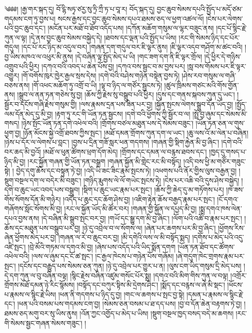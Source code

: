 \setcounter{footnote}{0} 
༄༅༅། །རྒྱ་གར་སྐད་དུ། བོ་ངྷི་སཏྭ་ཙརྱ་སུ་ཏྲི་ཀྲྀ་ཏ་པ་བཱ་ར། བོད་སྐད་དུ། བྱང་ཆུབ་སེམས་དཔའི་སྤྱོད་པ་མདོ་ཙམ་གདམས་ངག་ཏུ་བྱས་པ། སངས་རྒྱས་དང་བྱང་ཆུབ་སེམས་དཔའ་ཐམས་ཅད་ལ་ཕྱག་འཚལ་ལོ། །ངེས་པར་ལེགས་པའི་བྱང་ཆུབ་དང་། །མངོན་པར་མཐོ་བ་ཐོབ་འདོད་པས། །དཀོན་མཆོག་གསུམ་ལ་ལྷར་བཟུང་ནས། །དང་པོ་སྙིང་རྗེ་ཀུན་ལ་ལྟ། །དེ་ནས་བྱང་ཆུབ་སེམས་བསྐྱེད་དེ། །ཐབས་དང་ལྡན་པའི་སྤྱོད་པ་ཡིས། །རང་གི་སེམས་ཉིད་དང་པོར་གདུལ། །དང་པོ་རང་ཉིད་མ་འདུལ་བར། །གཞན་དག་གདུལ་བར་ཇི་ལྟར་ནུས། །ཇི་ལྟར་འདབ་གཤོག་མ་ཚང་བའི། །བྱ་ཡིས་མཁའ་ལ་འཕུར་མི་ནུས། །དེ་བཞིན་ལྟ་སྤྱོད་མེད་པ་ཡི། །གང་ཟག་དག་ནི་ཇི་ལྟར་གྲོལ། །དེ་ཕྱིར་དེ་གཉིས་འགྲུབ་པའི་ཕྱིར། །དཀའ་བའི་འབད་པ་ཆེན་པོས་བྱ། །དཀའ་བས་སྦྱང་བ་མ་བྱས་པར། །སླ་བས་གོམས་པར་ཇི་ལྟར་འགྱུར། །གོ་བགོས་ཁུར་ཁྱེར་རྒྱལ་སྲས་དེས། །དགེ་བའི་བཤེས་གཉེན་བསྟེན་བྱས་ཏེ། །ཤེས་རབ་གསུམ་ལ་གཞི་བཅས་ནས། །གོ་འཕང་མཆོག་ཏུ་འགྲོ་བ་ཡི། །ལྟ་བ་ཉིད་ལ་གཙོར་སྦྱངས་ཏེ། །ཚུལ་ཁྲིམས་གཙང་མའི་གོས་གྱོན་ནས། །སྒྲུབ་ལ་ནན་ཏན་གཅེས་སུ་བྱ། །ཆོས་ཀྱི་རྗེས་སུ་བསྒྲུབ་པའི་ཕྱིར། །དུས་དང་གནས་སྐབས་ཀུན་དུ་ཡང་། །སྦྱོར་བ་དངོས་གཞི་རྗེས་གསུམ་གྱི། །ལས་རྣམས་དྲན་པས་ཟིན་པར་བྱ། །སྐྱོན་སྤངས་ལེགས་སྒྲུབ་དོན་ཡོད་བྱ། །སྤྱོད་ལམ་དོན་མེད་དུ་མི་བྱ། །རྟག་ཏུ་རང་གི་ཡོན་ཏན་སྦྱངས། །དགེ་བའི་ཕྱོགས་ཀྱི་སྦྱོར་བ་ལ། །སྤྲོ་བྱ་ཞུམ་དང་སེམས་མི་གསད། །ཉེས་སྤོང་ཡོན་ཏན་དགེ་འཕེལ་བའི། །གྲོགས་བཙལ་མཐུན་པས་དེ་སེམས་བཟུང་། །ཡོན་ཏན་ཅན་ལ་གུས་ཕྱག་བྱ། །ཉོན་མོངས་སྐྱེ་འགྲོ་ཐབས་ཀྱིས་སྤང་། །མཐོ་དམན་གྲོགས་ཀུན་དག་ལ་ཡང་། །ཆུ་ལས་འོ་མ་ལེན་པ་བཞིན། །ཉེས་པ་དོར་ལ་ལེགས་པ་བླང་། །བྱས་པ་དྲིན་གཟོ་སླར་ཕན་གདགས། །གཞན་གྱི་སྡིག་རྐྱེན་མི་བྱ་ཞིང་། །དགེ་བའི་བར་ཆད་མི་བྱའོ། །མཐོ་ལ་ཕུན་ཚོགས་ཕྲག་དོག་མེད། །གྲོགས་དང་དམན་ལ་བརྙས་ཐབས་དང་། །ཁྱད་དུ་གསད་པ་ཉིད་མི་བྱ། །རང་སྐྱོན་གཞན་གྱི་ཡོན་ཏན་བསྒྲག །གཞན་སྐྱོན་མི་གླེང་རང་མི་བསྟོད། །འདི་བས་ཕྱི་མ་གཙོར་གཟུང་སྟེ། །
བྱེད་དགུ་ཆོས་དང་བསྟུན་ཏེ་བྱ། །འདི་ཡི་ཟང་ཟིང་རྣམ་སྤངས་ཏེ། །འཕགས་པའི་ནོར་གྱིས་ལུས་བརྒྱན་བྱ། །སྡུག་བསྔལ་དག་ལ་བདེར་མི་བཟུང་། །གཉིད་རྨུགས་ལེ་ལོ་གཡེང་སྤངས་ཏེ། །ངེས་པར་འཆི་བའི་དུས་ཤེས་བསྐྱེད། །དགེ་བ་ཆུང་ཡང་འབད་པས་བསྒྲུབ། །སྡིག་པ་ཆུང་ཡང་རྣམ་པར་སྤང་། །ཆོས་ཀྱི་ཆེད་དུ་མ་གཏོགས་པར། །ཁ་ཟས་གོས་སོགས་དོན་མི་གཉེར། །འདོད་པ་ཆུང་དང་ཆོག་ཤེས་བྱ། །འཇིག་རྟེན་ཆོས་བརྒྱད་རྣམ་པར་སྤང་། །ངོ་དགའ་གཞོགས་སློང་སོགས་མི་བྱ། །རང་ལ་སྐྱོན་ཡོད་མི་ཚོར་བར། །གཞན་གྱི་སྐྱོན་ལ་དཔྱད་མི་བྱ། །སྨྲ་དགའ་ཁས་ལེན་དཔའ་བྱས་ནས། །དེ་བཞིན་མི་སྒྲུབ་སྤང་བར་བྱ། །གཡོ་དང་སྒྱུ་དག་མི་བྱ་ཞིང་། །ལོག་པའི་འཚོ་བ་རྣམ་པར་སྤང་། །ཆོས་དང་མཐུན་པས་བསྒྲུབ་པར་བྱ། །ཉེ་དུ་འབྲེལ་བ་ལ་སོགས་ལ། །ཞེན་པར་ཆགས་པར་མི་བྱ་ཞིང་། །ཕྱོགས་རིས་ཞེན་ཕྱོགས་མེད་པར་བྱ། །གཞན་ལ་རེ་བ་ཆུང་བར་བྱ། །མི་དགེའི་ལས་ལ་མི་བསྟོད་སྨད། །དགོས་པ་མེད་པའི་འདུ་འཛི་སྤང་། །བྲེ་མོའི་གཏམ་ལ་དགའ་མི་བྱ། །ཞེས་པས་འདོད་པའི་ཡིད་སྨོན་དགག །ཡོན་ཏན་ཐོབ་དང་ཚོགས་འཕེལ་བའི། །ལས་ལ་ཞུམ་དང་ངོ་ཚ་སྤང་། །ང་རྒྱལ་ཁེངས་པ་གཉེན་པོས་གཞོམ། །ཞེ་གདུག་ཁེང་གྲགས་རྣམ་པར་སྤང་། །དངོས་དང་བརྒྱུད་པས་སེམས་ཅན་ཀུན། །ཉེ་དུ་འབྲེལ་པར་གྱུར་པ་ན། །ལུས་ངག་ཡིད་གསུམ་དྲི་མེད་པས། །དེ་དག་ཀུན་ལ་བུ་བཞིན་བལྟ། །སྙིང་རྗེས་བཞིན་འཛུམ་གསོང་པོར་སྨྲ། །དགའ་བའི་མིག་གིས་ཀུན་ལ་བལྟ། །འགྲོར་གྲོགས་མཐོ་དམན་ཉེ་རིང་སྙོམས། །བསྟོད་དང་བཀུར་སྟིས་མི་དྲེགས་ཤིང་། །སྨོད་དང་བརྙས་ལ་ཞེ་མི་སྡང་། །ཕོངས་པ་རྣམས་ལ་སྙིང་རྗེ་ཡིས། །ཕན་ནི་གདགས་པ་ཉིད་དུ་བྱ། །གང་ལ་ཆགས་པ་སྤང་བྱ་སྟེ། །དམན་པ་རྣམས་ལ་སྙིང་རྗེ་དང་། །ཕན་པའི་བསམ་པས་གདམས་ངག་བྱ། །སེམས་ཅན་བསམ་པ་ཐ་དད་པས། །བྱ་བ་དོན་ཆེན་བརྟགས་ཏེ་བྱ། །ཐམས་ཅད་མགུ་བར་སུ་ཡིས་ནུས། །འོན་ཀྱང་འགྱོད་པ་མེད་པ་ཡིས། །སྡུག་བསྔལ་ཁྱད་བསད་བདེ་མ་ཆགས། །རང་གི་སེམས་སྦྱང་གཞན་སེམས་གཟུང་། །
